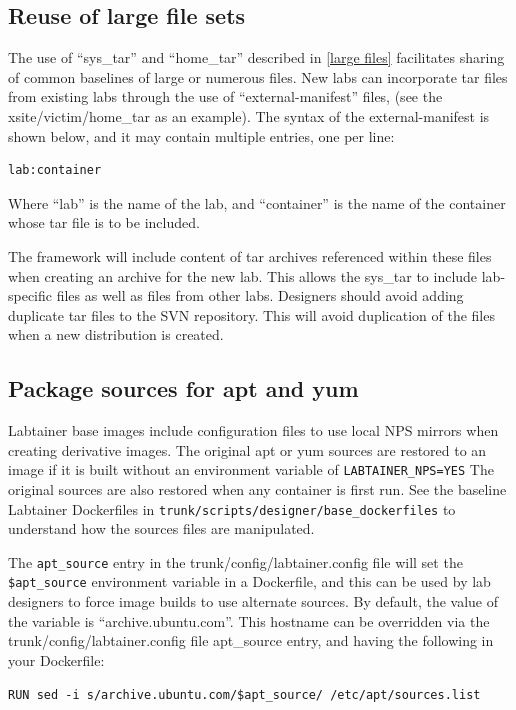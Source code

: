 \documentclass[12pt]{article}
\begin{document}
\subsection{Reuse of large file sets}
\label{manifest}
The use of ``sys\_tar'' and ``home\_tar'' described in \ref{large files} facilitates sharing of common
baselines of large or numerous files.  New labs can incorporate tar files from existing
labs through the use of ``external-manifest'' files, (see the xsite/victim/home\_tar as
an example).   The syntax of the external-manifest is shown below, and it may contain
multiple entries, one per line:
\begin{verbatim}
lab:container
\end{verbatim}
\noindent Where ``lab'' is the name of the lab, and ``container'' is the name of the container
whose tar file is to be included.

The framework will include content of tar archives referenced within these files
when creating an archive for the new lab.  This allows the sys\_tar to include lab-specific files
as well as files from other labs.  Designers should avoid adding duplicate tar files to the SVN repository.
This will avoid duplication of the files when a new distribution is created.

\subsection{Package sources for apt and yum}
\label{package sources}
Labtainer base images include configuration files to use local NPS mirrors when creating derivative
images.  The original apt or yum sources are restored to an image if it is built without an environment
variable of {\tt LABTAINER\_NPS=YES}  The original sources are also restored when any container is first
run.  See the baseline Labtainer Dockerfiles in {\tt trunk/scripts/designer/base\_dockerfiles} to understand
how the sources files are manipulated.

The {\tt apt\_source} entry in the trunk/config/labtainer.config file will set the {\tt \$apt\_source}
environment variable in a Dockerfile, and this can be used by lab designers to force image builds to use
alternate sources.  By default, the value of the variable is ``archive.ubuntu.com''.  This hostname can be 
overridden via the trunk/config/labtainer.config file apt\_source entry, and having the following in your Dockerfile:
\begin{verbatim}
RUN sed -i s/archive.ubuntu.com/$apt_source/ /etc/apt/sources.list
\end{verbatim}
\end{document}
